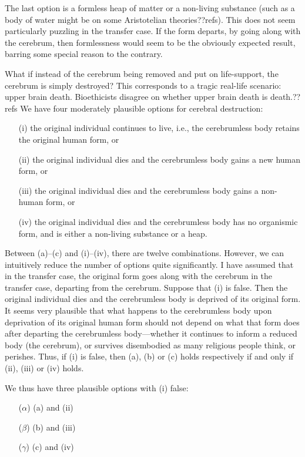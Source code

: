 The last option is a formless heap of matter or a non-living substance (such as a body of water might be on some 
Aristotelian theories??refs). This does not 
seem particularly puzzling in the transfer case. 
If the form departs, by going along with the cerebrum, then formlessness would seem to be the obviously expected result, 
barring some special reason to the contrary.

What if instead of the cerebrum being removed and put on life-support, the cerebrum is simply destroyed? This corresponds
to a tragic real-life scenario: upper brain death. Bioethicists disagree on whether upper brain death is death.??refs
We have four moderately plausible options for cerebral destruction:
\begin{itemize}
\item[(i)] the original individual continues to live, i.e., the cerebrumless body retains the original human form, or
\item[(ii)] the original individual dies and the cerebrumless body gains a new human form, or
\item[(iii)] the original individual dies and the cerebrumless body gains a non-human form, or
\item[(iv)] the original individual dies and the cerebrumless body has no organismic form, and is either a non-living substance or a heap.
\end{itemize}

Between (a)--(c) and (i)--(iv), there are twelve combinations. 
However, we can intuitively reduce the number of options quite significantly. I have assumed that in the transfer
case, the original form goes along with the cerebrum in the transfer case, departing from the cerebrum. Suppose that
(i) is false. Then the original individual dies and the cerebrumless body is deprived of its original form. It seems
very plausible that what happens to the cerebrumless body upon deprivation of its original human form should not depend
on what that form does after departing the cerebrumless body---whether it continues to inform a reduced body (the cerebrum), 
or survives disembodied as many religious people think, or perishes. Thus, if (i) is false, then (a), (b) or (c) holds
respectively if and only if (ii), (iii) or (iv) holds. 

We thus have three plausible options with (i) false:
\begin{itemize}
\item[($\alpha$)] (a) and (ii)
\item[($\beta$)] (b) and (iii)
\item[($\gamma$)] (c) and (iv)
\end{itemize}

